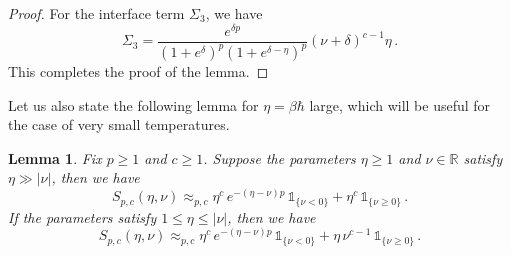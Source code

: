 \documentclass[11pt]{amsart}
\theoremstyle{plain}
\newtheorem{lem}[theorem]{Lemma}
\theoremstyle{definition}
\newcommand		{\RR}		{\mathbb R}			%
\newcommand		{\R}		{\RR}
\newcommand		{\lt}			{\left}				%
\newcommand		{\rt}			{\right}			%
\renewcommand	{\(}			{\lt(}
\renewcommand	{\)}			{\rt)}
\newcommand		{\n}[1]			{\lt\lvert #1 \rt\rvert}
\newcommand		{\indic}	{\mathds{1}}		%
\begin{document}
\begin{proof}
		For the interface term $\Sigma_3$, we have 
		\begin{equation}\label{eq:interface_term}
			\Sigma_3 = \frac{e^{\delta p}}{\lt(1+e^{\delta}\rt)^p \lt(1+e^{\delta-\eta}\rt)^p} \lt(\nu+\delta\rt)^{c-1} \eta \, .
		\end{equation}
		This completes the proof of the lemma.
	\end{proof}

	Let us also state the following lemma for $\eta = \beta\hbar$ large, which will be useful for the case of very small temperatures.
	\begin{lem}\label{lem:S_summation_large_eta}
		Fix $p\ge 1$ and $c\ge 1$. Suppose the parameters $\eta\ge 1$ and $\nu \in \R$ satisfy $\eta\gg \n{\nu}$, then we have
		\begin{equation*}
			S_{p,c}(\eta,\nu)\approx_{p,c} \eta^c\, e^{-(\eta-\nu)p}\, \indic_{\{\nu < 0\}} +  \eta^c \, \indic_{\{\nu \ge 0\}}\,.
		\end{equation*} 
		If the parameters satisfy $1\le \eta\le \n{\nu}$, then we have 
		\begin{equation*}
			S_{p,c}(\eta, \nu) \approx_{p, c} \eta^c \, e^{-(\eta-\nu)p} \, \indic_{\{\nu < 0\}} +  \eta \, \nu^{c-1} \, \indic_{\{\nu \ge 0\}}\,.
		\end{equation*}
	\end{lem}
\end{document}

